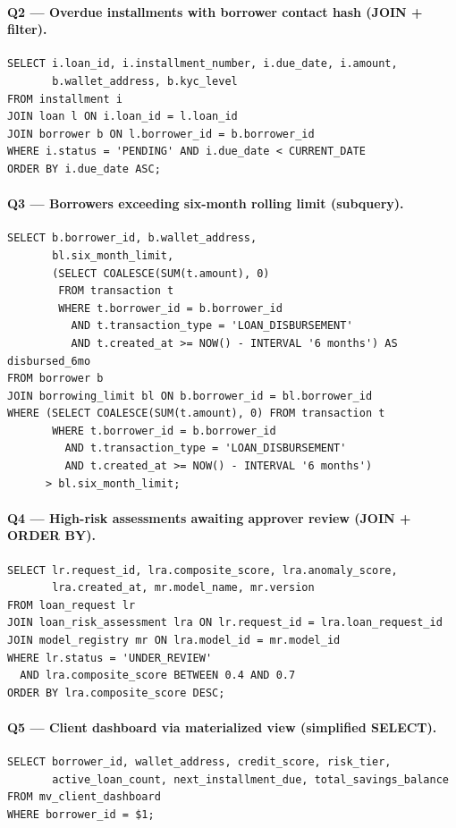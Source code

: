 \documentclass[12pt,a4paper]{report}
\begin{document}
\paragraph{Q2 --- Overdue installments with borrower contact hash (JOIN + filter).}
\begin{verbatim}
SELECT i.loan_id, i.installment_number, i.due_date, i.amount,
       b.wallet_address, b.kyc_level
FROM installment i
JOIN loan l ON i.loan_id = l.loan_id
JOIN borrower b ON l.borrower_id = b.borrower_id
WHERE i.status = 'PENDING' AND i.due_date < CURRENT_DATE
ORDER BY i.due_date ASC;
\end{verbatim}

\paragraph{Q3 --- Borrowers exceeding six-month rolling limit (subquery).}
\begin{verbatim}
SELECT b.borrower_id, b.wallet_address,
       bl.six_month_limit,
       (SELECT COALESCE(SUM(t.amount), 0)
        FROM transaction t
        WHERE t.borrower_id = b.borrower_id
          AND t.transaction_type = 'LOAN_DISBURSEMENT'
          AND t.created_at >= NOW() - INTERVAL '6 months') AS disbursed_6mo
FROM borrower b
JOIN borrowing_limit bl ON b.borrower_id = bl.borrower_id
WHERE (SELECT COALESCE(SUM(t.amount), 0) FROM transaction t
       WHERE t.borrower_id = b.borrower_id
         AND t.transaction_type = 'LOAN_DISBURSEMENT'
         AND t.created_at >= NOW() - INTERVAL '6 months')
      > bl.six_month_limit;
\end{verbatim}

\paragraph{Q4 --- High-risk assessments awaiting approver review (JOIN + ORDER BY).}
\begin{verbatim}
SELECT lr.request_id, lra.composite_score, lra.anomaly_score,
       lra.created_at, mr.model_name, mr.version
FROM loan_request lr
JOIN loan_risk_assessment lra ON lr.request_id = lra.loan_request_id
JOIN model_registry mr ON lra.model_id = mr.model_id
WHERE lr.status = 'UNDER_REVIEW'
  AND lra.composite_score BETWEEN 0.4 AND 0.7
ORDER BY lra.composite_score DESC;
\end{verbatim}

\paragraph{Q5 --- Client dashboard via materialized view (simplified SELECT).}
\begin{verbatim}
SELECT borrower_id, wallet_address, credit_score, risk_tier,
       active_loan_count, next_installment_due, total_savings_balance
FROM mv_client_dashboard
WHERE borrower_id = $1;
\end{verbatim}
\end{document}
